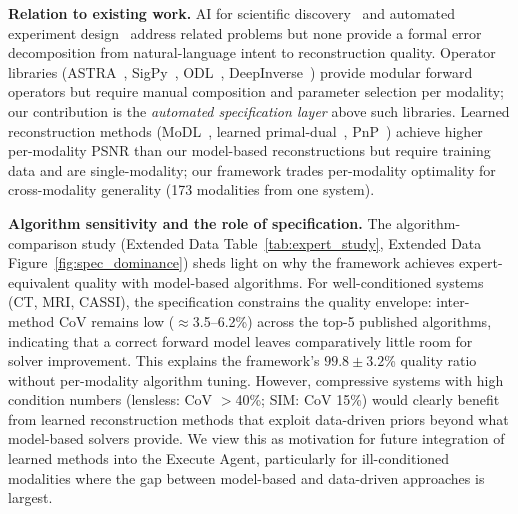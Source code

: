 \documentclass[11pt,a4paper]{article}
\begin{document}
\textbf{Relation to existing work.}
AI for scientific discovery~\cite{jumper2021alphafold,merchant2023gnome,wang2023scientific,boiko2023autonomous} and automated experiment design~\cite{tian2023ci,boiko2023autonomous} address related problems but none provide a formal error decomposition from natural-language intent to reconstruction quality.  Operator libraries (ASTRA~\cite{aarle2016}, SigPy~\cite{ong2019sigpy}, ODL~\cite{adler2017odl}, DeepInverse~\cite{tachella2023deepinverse}) provide modular forward operators but require manual composition and parameter selection per modality; our contribution is the \emph{automated specification layer} above such libraries.  Learned reconstruction methods (MoDL~\cite{aggarwal2019modl}, learned primal-dual~\cite{adler2018learned}, PnP~\cite{kamilov2023pnp}) achieve higher per-modality PSNR than our model-based reconstructions but require training data and are single-modality; our framework trades per-modality optimality for cross-modality generality (173 modalities from one system).

\textbf{Algorithm sensitivity and the role of specification.}
The algorithm-comparison study (Extended Data Table~\ref{tab:expert_study}, Extended Data Figure~\ref{fig:spec_dominance}) sheds light on why the framework achieves expert-equivalent quality with model-based algorithms.  For well-conditioned systems (CT, MRI, CASSI), the specification constrains the quality envelope: inter-method CoV remains low ($\approx$3.5--6.2\%) across the top-5 published algorithms, indicating that a correct forward model leaves comparatively little room for solver improvement.  This explains the framework's $99.8\pm3.2$\% quality ratio without per-modality algorithm tuning.  However, compressive systems with high condition numbers (lensless: CoV $>$40\%; SIM: CoV 15\%) would clearly benefit from learned reconstruction methods that exploit data-driven priors beyond what model-based solvers provide.  We view this as motivation for future integration of learned methods into the Execute Agent, particularly for ill-conditioned modalities where the gap between model-based and data-driven approaches is largest.
\end{document}
